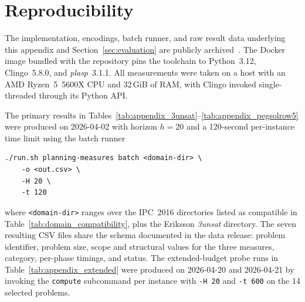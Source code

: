 \section{Reproducibility}
\label{app:reproducibility}

The implementation, encodings, batch runner, and raw result data underlying this appendix and Section~\ref{sec:evaluation} are publicly archived~\cite{Bunge2026}. The Docker image bundled with the repository pins the toolchain to Python~3.12, Clingo~5.8.0, and \textit{plasp}~3.1.1. All measurements were taken on a host with an AMD Ryzen~5~5600X CPU and 32\,GiB of RAM, with Clingo invoked single-threaded through its Python \ac{API}.

The primary results in Tables~\ref{tab:appendix_3unsat}--\ref{tab:appendix_pegsolrow5} were produced on \mbox{2026-04-02} with horizon $h = 20$ and a 120-second per-instance time limit using the batch runner

\begin{verbatim}
./run.sh planning-measures batch <domain-dir> \
    -o <out.csv> \
    -H 20 \
    -t 120
\end{verbatim}

where \texttt{<domain-dir>} ranges over the \ac{IPC}~2016 directories listed as compatible in Table~\ref{tab:domain_compatibility}, plus the Eriksson \textit{3unsat} directory. The seven resulting CSV files share the schema documented in the data release: problem identifier, problem size, scope and structural values for the three measures, category, per-phase timings, and status. The extended-budget probe runs in Table~\ref{tab:appendix_extended} were produced on \mbox{2026-04-20} and \mbox{2026-04-21} by invoking the \texttt{compute} subcommand per instance with \texttt{-H~20} and \texttt{-t~600} on the 14 selected problems.
